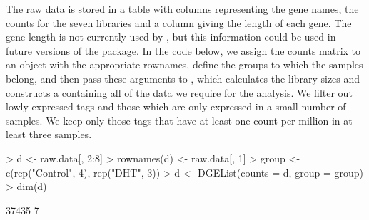 The raw data is stored in a table with columns representing the gene
names, the counts for the seven libraries and a column giving the
length of each gene. The gene length is not currently used by \edgeR,
but this information could be used in future versions of the
package. In the code below, we assign the counts matrix to an object
 with the appropriate rownames, define the groups to which the
samples belong, and then pass these arguments to , which
calculates the library sizes and constructs a 
containing all of the data we require for the analysis. We filter out
lowly expressed tags and those which are only expressed in a small
number of samples. We keep only those tags that have at least one
count per million in at least three samples.

\begin{Schunk}
\begin{Sinput}
> d <- raw.data[, 2:8]
> rownames(d) <- raw.data[, 1]
> group <- c(rep("Control", 4), rep("DHT", 3))
> d <- DGEList(counts = d, group = group)
> dim(d)
\end{Sinput}
\begin{Soutput}
[1] 37435     7
\end{Soutput}
\end{Schunk}

